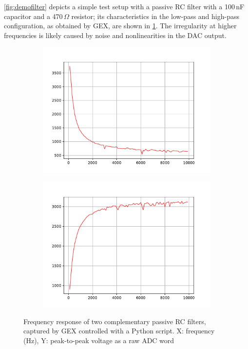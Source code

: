 \cref{fig:demofilter} depicts a simple test setup with a passive RC filter with a 100\,nF capacitor and a 470\,$\Omega$ resistor; its characteristics in the low-pass and high-pass configuration, as obtained by GEX, are shown in \cref{fig:demofilter_cap}. The irregularity at higher frequencies is likely caused by noise and nonlinearities in the \gls{DAC} output.

\begin{figure}
	\centering
	\begin{subfigure}{.5\textwidth}
		\centering
		\includegraphics[width=\linewidth]{img/filter1.pdf}
	\end{subfigure}%
	\begin{subfigure}{.5\textwidth}
		\centering
		\includegraphics[width=\linewidth]{img/filter2.pdf}
	\end{subfigure}
	\caption[RC filter frequency responses]{Frequency response of two complementary passive RC filters, captured by GEX controlled with a Python script. X: frequency (Hz), Y: peak-to-peak voltage as a raw ADC word }
	\label{fig:demofilter_cap}
\end{figure}

